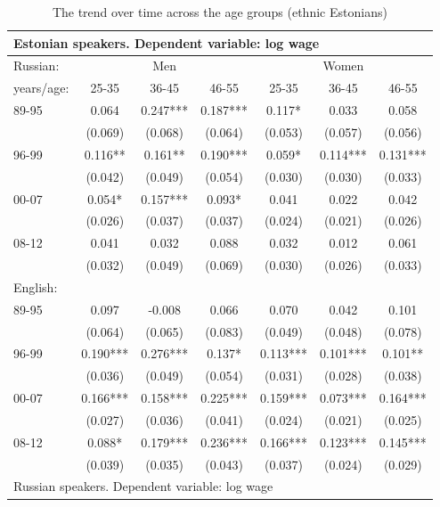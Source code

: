 \documentclass[12pt, a4paper]{article}
\begin{document}
\begin{table}[htbp]
	\centering
	\caption{The trend over time across the age groups (ethnic Estonians)}
	\begin{tabular}{lccc|cc c}
     \toprule
		\multicolumn{7}{l}{Estonian speakers. Dependent variable: log wage}     \\ \hline
		Russian:  &  \multicolumn{3}{c|}{Men}  &  \multicolumn{3}{c}{Women}  \\
		years/age: & 25-35  & 36-45  & 46-55  & 25-35  & 36-45  & 46-55  \\ \midrule
		89-95   & 0.064  & 0.247*** & 0.187*** & 0.117*  & 0.033  & 0.058  \\
		      & (0.069) & (0.068) & (0.064) & (0.053) & (0.057) & (0.056) \\
		96-99   & 0.116** & 0.161** & 0.190*** & 0.059*  & 0.114*** & 0.131*** \\
		      & (0.042) & (0.049) & (0.054) & (0.030) & (0.030) & (0.033) \\
		00-07   & 0.054*  & 0.157*** & 0.093*  & 0.041  & 0.022  & 0.042  \\
		      & (0.026) & (0.037) & (0.037) & (0.024) & (0.021) & (0.026) \\
		08-12   & 0.041  & 0.032  & 0.088  & 0.032  & 0.012  & 0.061  \\
		      & (0.032) & (0.049) & (0.069) & (0.030) & (0.026) & (0.033) \\ \hline
		English:  &     &     &     &     &     &     \\
		89-95   & 0.097  & -0.008  & 0.066  & 0.070  & 0.042  & 0.101  \\
		      & (0.064) & (0.065) & (0.083) & (0.049) & (0.048) & (0.078) \\
		96-99   & 0.190*** & 0.276*** & 0.137*  & 0.113*** & 0.101*** & 0.101** \\
		      & (0.036) & (0.049) & (0.054) & (0.031) & (0.028) & (0.038) \\
		00-07   & 0.166*** & 0.158*** & 0.225*** & 0.159*** & 0.073*** & 0.164*** \\
		      & (0.027) & (0.036) & (0.041) & (0.024) & (0.021) & (0.025) \\
		08-12   & 0.088*  & 0.179*** & 0.236*** & 0.166*** & 0.123*** & 0.145*** \\
		      & (0.039) & (0.035) & (0.043) & (0.037) & (0.024) & (0.029) \\ 
     \midrule
		\multicolumn{7}{l}{Russian speakers. Dependent variable: log wage}\\

\end{tabular}
\end{table}
\end{document}
